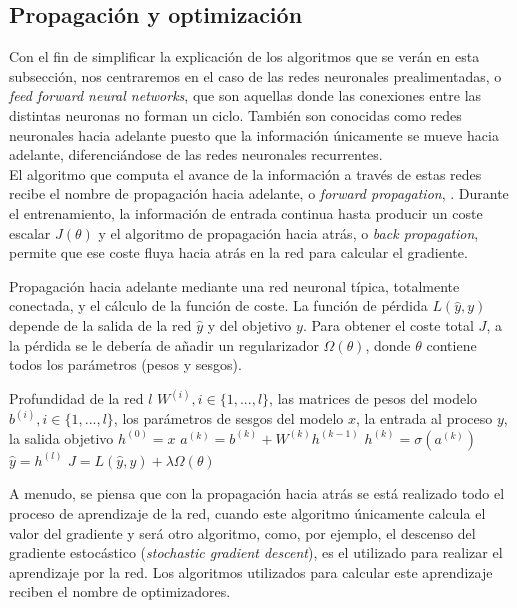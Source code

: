 \begin{itemize}
\subsection{Propagación y optimización}
Con el fin de simplificar la explicación de los algoritmos que se verán en esta subsección, nos centraremos en el caso de las redes neuronales prealimentadas, o \emph{feed forward neural networks}, que son aquellas donde las conexiones entre las distintas neuronas no forman un ciclo. También son conocidas como redes neuronales hacia adelante puesto que la información únicamente se mueve hacia adelante, diferenciándose de las redes neuronales recurrentes.\\

El algoritmo que computa el avance de la información a través de estas redes recibe el nombre de propagación hacia adelante, o \emph{forward propagation}, \cite{Goodfellow-et-al-2016}. Durante el entrenamiento, la información de entrada continua hasta producir un coste escalar $J(\theta)$ y el algoritmo de propagación hacia atrás, o \emph{back propagation}, permite que ese coste fluya hacia atrás en la red para calcular el gradiente. \\

\begin{algorithm}
\caption{Propagación hacia adelante mediante una red neuronal típica, totalmente conectada, y el cálculo de la función de coste. La función de pérdida $L(\hat{y},y)$ depende de la salida de la red $\hat{y}$ y del objetivo $y$. Para obtener el coste total $J$, a la pérdida se le debería de añadir un regularizador $\Omega(\theta)$, donde $\theta$ contiene todos los parámetros (pesos y sesgos). \cite{Goodfellow-et-al-2016}}
\begin{algorithmic}\label{alg:forward}
\REQUIRE Profundidad de la red $l$
\REQUIRE $W^{(i)}, i\in\{1,...,l\}$, las matrices de pesos del modelo
\REQUIRE $b^{(i)}, i\in\{1,...,l\}$, los parámetros de sesgos del modelo
\REQUIRE $x$, la entrada al proceso
\REQUIRE $y$, la salida objetivo
\STATE $h^{(0)}=x$
\STATE $a^{(k)}=b^{(k)}+W^{(k)}h^{(k-1)}$
\STATE $h^{(k)}=\sigma(a^{(k)})$
\ENDFOR
\STATE $\hat{y}=h^{(l)}$
\STATE $J=L(\hat{y},y)+\lambda\Omega (\theta)$
\end{algorithmic}
\end{algorithm}

A menudo, se piensa que con la propagación hacia atrás se está realizado todo el proceso de aprendizaje de la red, cuando este algoritmo únicamente calcula el valor del gradiente y será otro algoritmo, como, por ejemplo, el descenso del gradiente estocástico (\emph{stochastic gradient descent}), es el utilizado para realizar el aprendizaje por la red. Los algoritmos utilizados para calcular este aprendizaje reciben el nombre de optimizadores.\\


\end{itemize}
